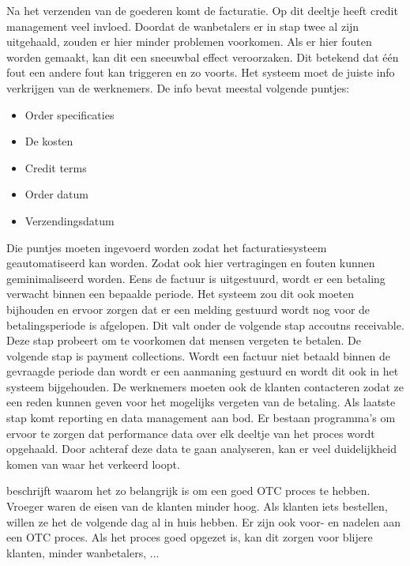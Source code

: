 Na het verzenden van de goederen komt de facturatie. Op dit deeltje heeft credit management veel invloed. Doordat de wanbetalers er in stap twee al zijn uitgehaald, zouden er hier minder problemen voorkomen. Als er hier fouten worden gemaakt, kan dit een sneeuwbal effect veroorzaken. Dit betekend dat één fout een andere fout kan triggeren en zo voorts. Het systeem moet de juiste info verkrijgen van de werknemers. De info bevat meestal volgende puntjes:
\begin{itemize}
	\item Order specificaties
	\item De kosten
	\item Credit terms
	\item Order datum
	\item Verzendingsdatum
\end{itemize}
Die puntjes moeten ingevoerd worden zodat het facturatiesysteem geautomatiseerd kan worden. Zodat ook hier vertragingen en fouten kunnen geminimaliseerd worden. Eens de factuur is uitgestuurd, wordt er een betaling verwacht binnen een bepaalde periode. Het systeem zou dit ook moeten bijhouden en ervoor zorgen dat er een melding gestuurd wordt nog voor de betalingsperiode is afgelopen. Dit valt onder de volgende stap accoutns receivable. Deze stap probeert om te voorkomen dat mensen vergeten te betalen. 
De volgende stap is payment collections. Wordt een factuur niet betaald binnen de gevraagde periode dan wordt er een aanmaning gestuurd en wordt dit ook in het systeem bijgehouden. De werknemers moeten ook de klanten contacteren zodat ze een reden kunnen geven voor het mogelijks vergeten van de betaling. 
Als laatste stap komt reporting en data management aan bod. Er bestaan programma's om ervoor te zorgen dat performance data over elk deeltje van het proces wordt opgehaald. Door achteraf deze data te gaan analyseren, kan er veel duidelijkheid komen van waar het verkeerd loopt. 

\textcite{PEARSON2017} beschrijft waarom het zo belangrijk is om een goed OTC proces te hebben. Vroeger waren de eisen van de klanten minder hoog. Als klanten iets bestellen, willen ze het de volgende dag al in huis hebben. Er zijn ook voor- en nadelen aan een OTC proces. Als het proces goed opgezet is, kan dit zorgen voor blijere klanten, minder wanbetalers, ... 

